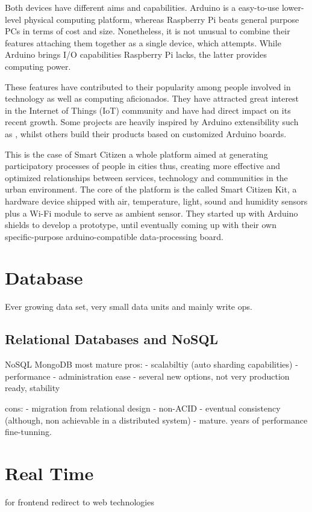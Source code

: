 Both devices have different aims and capabilities. Arduino is a easy-to-use lower-level physical computing platform, whereas Raspberry Pi beats general purpose PCs in terms of cost and size. Nonetheless, it is not unusual to combine their features attaching them together as a single device, which \cite{Arduberry} attempts. While Arduino brings I/O capabilities Raspberry Pi lacks, the latter provides computing power.

These features have contributed to their popularity among people involved in technology as well as computing aficionados. They have attracted great interest in the Internet of Things (IoT) community and have had direct impact on its recent growth. Some projects are heavily inspired by Arduino extensibility such as \cite{Thinking-Things}, whilst others build their products based on customized Arduino boards. 

This is the case of Smart Citizen a whole platform aimed at generating participatory processes of people in cities thus, creating more effective and optimized relationships between services, technology and communities in the urban environment. The core of the platform is the called Smart Citizen Kit, a hardware device shipped with air, temperature, light, sound and humidity sensors plus a Wi-Fi module to serve as ambient sensor. They started up with Arduino shields to develop a prototype, until eventually coming up with their own specific-purpose arduino-compatible data-processing board.

\section{Database}

Ever growing data set, very small data units and mainly write ops.

\subsection{Relational Databases and NoSQL}

NoSQL
MongoDB most mature
pros:
- scalabiltiy (auto sharding capabilities)
- performance
- administration ease
- several new options, not very production ready, stability

cons: 
- migration from relational design 
- non-ACID
- eventual consistency (although, non achievable in a distributed system)
- mature. years of performance fine-tunning. 

\section{Real Time}
for frontend redirect to web technologies

